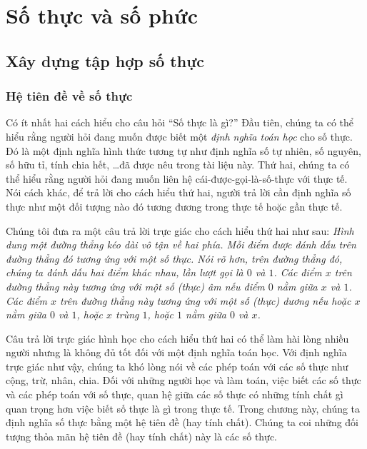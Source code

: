 \chapter{Số thực và số phức}\label{chapter:real-and-complex-numbers}

\section{Xây dựng tập hợp số thực}

\subsection{Hệ tiên đề về số thực}

Có ít nhất hai cách hiểu cho câu hỏi ``Số thực là gì?\@'' Đầu tiên, chúng ta có thể hiểu rằng người hỏi đang muốn được biết một \textit{định nghĩa toán học} cho số thực. Đó là một định nghĩa hình thức tương tự như định nghĩa số tự nhiên, số nguyên, số hữu tỉ, tính chia hết, \ldots đã được nêu trong tài liệu này. Thứ hai, chúng ta có thể hiểu rằng người hỏi đang muốn liên hệ cái-được-gọi-là-số-thực với thực tế. Nói cách khác, để trả lời cho cách hiểu thứ hai, người trả lời cần định nghĩa số thực như một đối tượng nào đó tương đương trong thực tế hoặc gần thực tế.

Chúng tôi đưa ra một câu trả lời trực giác cho cách hiểu thứ hai như sau: \textit{Hình dung một đường thẳng kéo dài vô tận về hai phía. Mỗi điểm được đánh dấu trên đường thẳng đó tương ứng với một số thực. Nói rõ hơn, trên đường thẳng đó, chúng ta đánh dấu hai điểm khác nhau, lần lượt gọi là $0$ và $1$. Các điểm $x$ trên đường thẳng này tương ứng với một số (thực) âm nếu điểm $0$ nằm giữa $x$ và $1$. Các điểm $x$ trên đường thẳng này tương ứng với một số (thực) dương nếu hoặc $x$ nằm giữa $0$ và $1$, hoặc $x$ trùng $1$, hoặc $1$ nằm giữa $0$ và $x$.}

Câu trả lời trực giác hình học cho cách hiểu thứ hai có thể làm hài lòng nhiều người nhưng là không đủ tốt đối với một định nghĩa toán học. Với định nghĩa trực giác như vậy, chúng ta khó lòng nói về các phép toán với các số thực như cộng, trừ, nhân, chia. Đối với những người học và làm toán, việc biết các số thực và các phép toán với số thực, quan hệ giữa các số thực có những tính chất gì quan trọng hơn việc biết số thực là gì trong thực tế. Trong chương này, chúng ta định nghĩa số thực bằng một hệ tiên đề (hay tính chất). Chúng ta coi những đối tượng thỏa mãn hệ tiên đề (hay tính chất) này là các số thực.

